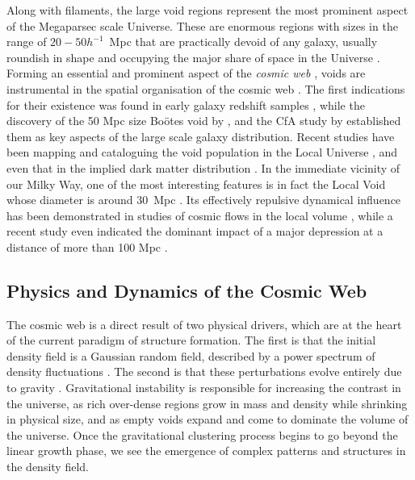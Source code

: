 \documentclass[useAMS,usenatbib]{mnras}
\begin{document}
Along with filaments, the large void regions represent the most prominent aspect of the Megaparsec scale Universe. These are enormous regions 
with sizes in the range of $20-50h^{-1}$~Mpc that are practically devoid of any galaxy, usually roundish in shape and occupying the major 
share of space in the Universe \citep[see][for a recent review]{weyiau308}.  Forming an essential and prominent aspect of the 
{\it cosmic web} \citep{bondweb1996}, voids are instrumental in the spatial organisation of the cosmic web \citep{icke1984,sahni1994,
shethwey2004,einasto2011b,aragon2013}. The first indications for their existence was found in early galaxy redshift samples 
\citep{chincarini1975,gregthomp1978,zeldovich1982}, while the discovery of the 50 Mpc size Bo\"otes void by \cite{kirshner1981}, \cite{kirshner1987} 
and the CfA study by \cite{lapparent1986} established them as key aspects of the large scale galaxy distribution. Recent studies have 
been mapping and cataloguing the void population in the Local Universe \citep{fairall1998,pan2012,sutter2012}, and even that in the implied dark 
matter distribution \citep{leclercq2015b}. In the immediate vicinity of our Milky Way, one of the most interesting features 
is in fact the Local Void whose diameter is around 30~Mpc \citep{tully_atlas1987}. Its effectively repulsive dynamical influence 
has been demonstrated in studies of cosmic flows in the local volume \citep{tully2008}, while a recent study even indicated the 
dominant impact of a major depression at a distance of more than 100 Mpc \citep[the so-called ``dipole repeller'',][]{hoffman2017}. 

\subsection{Physics and Dynamics of the Cosmic Web}
The cosmic web is a direct result of two physical drivers, which are at the heart of the current paradigm of structure formation. 
The first is that the initial density field is a Gaussian random field, described by a power spectrum of density fluctuations \citep{adler1981,bbks}. The second is that these perturbations evolve entirely due to gravity \citep{peebles1980}. Gravitational instability is responsible 
for increasing the contrast in the universe, as rich over-dense regions grow in mass and density while shrinking in physical size, and as empty 
voids expand and come to dominate the volume of the universe. Once the gravitational clustering process begins to go beyond the 
linear growth phase, we see the emergence of complex patterns and structures in the density field. 
\end{document}
